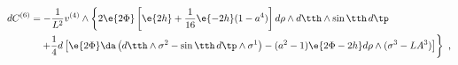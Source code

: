 \begin{equation}
\label{dC6}
\begin{split}
  dC^{(6)} &= -\frac1{L^2} v^{(4)} \wedge \left\{ 2 \e{2\Phi}
  \left[\e{2h} +\frac1{16} \e{-2h} (1-a^4) \right] d\rho\wedge
  d\tth \wedge \sin\tth\, d\tp \phantom{\frac12} \right. \\
  &\quad \left. + \frac14 d\left[ 
  \e{2\Phi} \da \left( d\tth \wedge \sigma^2 - \sin \tth\, d\tp \wedge
  \sigma^1 \right) 
  - (a^2-1) \e{2\Phi-2h} d\rho \wedge (\sigma^3-L A^3) \right] \right\}~,
\end{split}
\end{equation} 
